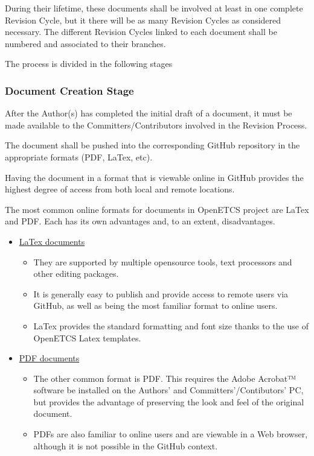\documentclass{template/openetcs_article}
\begin{document}
During their lifetime, these documents shall be involved at least in one complete Revision Cycle, but it there will be as many Revision Cycles as considered necessary. The different Revision Cycles linked to each document shall be numbered and associated to their branches.   

The process is divided in the following stages

\subsubsection{Document Creation Stage}

After the Author(s) has completed the initial draft of a document, it must be made available to the Committers/Contributors involved in the Revision Process. 

The document shall be pushed into the corresponding GitHub repository in the appropriate formats (PDF, LaTex, etc).

Having the document in a format that is viewable online in GitHub provides the highest degree of access from both local and remote locations. 

The most common online formats for documents in OpenETCS project are LaTex and PDF. Each has its own advantages and, to an extent, disadvantages. 

\begin{itemize}
\item \underline{LaTex documents}
\begin{itemize}
\item They are supported by multiple opensource tools, text processors and other editing packages. 
\item It is generally easy to publish and provide access to remote users via GitHub, as well as being the most familiar format to online users.
\item LaTex provides the standard formatting and font size thanks to the use of OpenETCS Latex templates. 
\end{itemize}
\item \underline{PDF documents}
\begin{itemize}
\item The other common format is PDF. This requires the Adobe Acrobat™ software be installed on the Authors' and Committers'/Contibutors' PC, but provides the advantage of preserving the look and feel of the original document. 
\item PDFs are also familiar to online users and are viewable in a Web browser, although it is not possible in the GitHub context.
\end{itemize}
\end{itemize}
\end{document}

